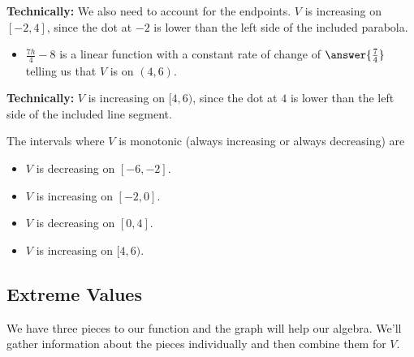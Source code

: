 \documentclass{ximera}
\begin{document}
\textbf{Technically:} We also need to account for the endpoints. $V$ is increasing on $[-2, 4]$, since the dot at $-2$ is lower than the left side of the included parabola.


\begin{question}
\begin{itemize}
\item \textbf{$\frac{7h}{4} - 8$} is a linear function with a constant rate of change of $\answer{\frac{7}{4}}$ telling us that $V$ is  on $(4, 6)$.
\end{itemize}
\end{question}

\textbf{Technically:} $V$ is increasing on $[4, 6)$, since the dot at $4$ is lower than the left side of the included line segment.


The intervals where $V$ is monotonic (always increasing or always decreasing) are

\begin{itemize}
\item $V$ is decreasing on $[-6,-2]$.
\item $V$ is increasing on $[-2,0]$.
\item $V$ is decreasing on $[0,4]$.
\item $V$ is increasing on $[4,6)$.
\end{itemize}









\subsection*{Extreme Values} 


We have three pieces to our function and the graph will help our algebra. We'll gather information about the pieces individually and then combine them for $V$.
\end{document}

